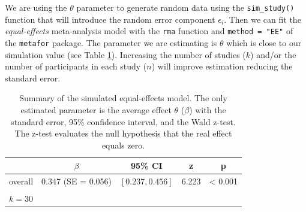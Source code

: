 \documentclass[
  man,floatsintext]{apa6}
\newenvironment{Shaded}{\begin{snugshade}}{\end{snugshade}}
\newcommand{\AttributeTok}[1]{\textcolor[rgb]{0.13,0.29,0.53}{#1}}
\newcommand{\CommentTok}[1]{\textcolor[rgb]{0.56,0.35,0.01}{\textit{#1}}}
\newcommand{\DecValTok}[1]{\textcolor[rgb]{0.00,0.00,0.81}{#1}}
\newcommand{\FloatTok}[1]{\textcolor[rgb]{0.00,0.00,0.81}{#1}}
\newcommand{\FunctionTok}[1]{\textcolor[rgb]{0.13,0.29,0.53}{\textbf{#1}}}
\newcommand{\NormalTok}[1]{#1}
\newcommand{\OtherTok}[1]{\textcolor[rgb]{0.56,0.35,0.01}{#1}}
\newcommand{\SpecialCharTok}[1]{\textcolor[rgb]{0.81,0.36,0.00}{\textbf{#1}}}
\newcommand{\StringTok}[1]{\textcolor[rgb]{0.31,0.60,0.02}{#1}}
\begin{document}
\scriptsize

\begin{Shaded}
\end{Shaded}

\normalsize

\color{red}

We are using the \(\theta\) parameter to generate random data using the \texttt{sim\_study()} function that will introduce the random error component \(\epsilon_{i}\). Then we can fit the \emph{equal-effects} meta-analysis model with the \texttt{rma} function and \texttt{method\ =\ "EE"} of the \texttt{metafor} package. The parameter we are estimating is \(\theta\) which is close to our simulation value (see Table \ref{tab:res-equal-effects}). Increasing the number of studies (\(k\)) and/or the number of participants in each study (\(n\)) will improve estimation reducing the standard error.
\color{black}

\scriptsize

\begin{table}[H]

\caption{\label{tab:res-equal-effects}\color{red} Summary of the simulated equal-effects model. The only estimated parameter is the average effect \(\theta\) (\(\beta\)) with the standard error, 95\% confidence interval, and the Wald z-test. The z-test evaluates the null hypothesis that the real effect equals zero.\color{black}}
\centering
\fontsize{9}{11}\selectfont
\begin{tabular}[t]{ccccc}
\toprule
 & $\beta$ & 95\% CI & z & p\\
\midrule
overall & 0.347 (SE = 0.056) & $[0.237, 0.456]$ & 6.223 & < 0.001\\
\bottomrule
\multicolumn{5}{l}{\textsuperscript{} $k = 30$}\\
\end{tabular}
\end{table}
\end{document}
